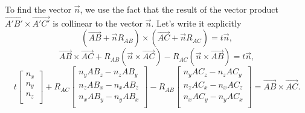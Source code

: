 \documentclass[
11pt,
tightenlines,
twoside,
onecolumn,
nofloats,
nobibnotes,
nofootinbib,
superscriptaddress,
noshowpacs,
centertags]
{revtex4}
\begin{document}
To find the vector $\vec{n}$, we use the fact that  the result of
the vector product $\vec{A'B'} \times \vec{A'C'}$ is collinear to
the vector $\vec{n}$.
Let's write it explicitly
\begin{equation*}
(\vec{AB} + \vec{n} R_{AB}) \times (\vec{AC} + \vec{n} R_{AC}) = t
\vec{n},
\end{equation*}
\begin{equation*}
\vec{AB} \times \vec{AC} + R_{AB} (\vec{n} \times \vec{AC}) - R_{AC}
(\vec{n} \times \vec{AB}) = t \vec{n},
\end{equation*}
\begin{equation*}
t
\left[ { \begin{array}{c}
            n_x \\
            n_y \\
            n_z \\
         \end{array} } \right]
+ R_{AC}
\left[ { \begin{array}{c}
            n_y AB_z - n_z AB_y  \\
            n_z AB_x - n_x AB_z \\
            n_x AB_y - n_y AB_x \\
         \end{array} } \right]
- R_{AB}
\left[ { \begin{array}{c}
            n_y AC_z - n_z AC_y \\
            n_z AC_x - n_x AC_z \\
            n_x AC_y - n_y AC_x \\
         \end{array} } \right]
= \vec{AB} \times \vec{AC}.
\end{equation*}
\end{document}
